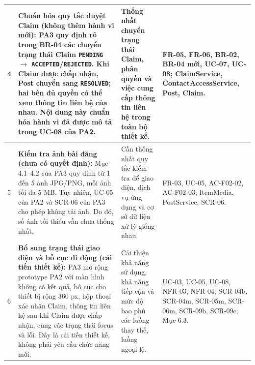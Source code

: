 \begin{longtable}{|p{}|p{}|p{}|p{}|}
4 &
\textbf{Chuẩn hóa quy tắc duyệt Claim (không thêm hành vi mới):}
PA3 quy định rõ trong BR-04 các chuyển trạng thái Claim
\texttt{PENDING} $\rightarrow$
\texttt{ACCEPTED}/\texttt{REJECTED}.
Khi Claim được chấp nhận, Post chuyển sang
\texttt{RESOLVED}; hai bên đủ quyền có thể xem
thông tin liên hệ của nhau. Nội dung này chuẩn hóa
hành vi đã được mô tả trong UC-08 của PA2.
&
Thống nhất chuyển trạng thái Claim, phân quyền
và việc cung cấp thông tin liên hệ trong toàn bộ
thiết kế.
&
FR-05, FR-06, BR-02, BR-04 mới,
UC-07, UC-08;
ClaimService, ContactAccessService,
Post, Claim.
\\ \hline

5 &
\textbf{Kiểm tra ảnh bài đăng (chưa có quyết định):}
Mục 4.1--4.2 của PA3 quy định từ 1 đến 5 ảnh JPG/PNG,
mỗi ảnh tối đa 5 MB. Tuy nhiên, UC-05 của PA2 và
SCR-06 của PA3 cho phép không tải ảnh.
Do đó, số ảnh tối thiểu vẫn chưa thống nhất.
&
Cần thống nhất quy tắc kiểm tra để giao diện,
dịch vụ ứng dụng và cơ sở dữ liệu xử lý giống nhau.
&
FR-03, UC-05, AC-F02-02, AC-F02-03;
ItemMedia, PostService, SCR-06.
\\ \hline

6 &
\textbf{Bổ sung trạng thái giao diện và bố cục di động (cải tiến thiết kế):}
PA3 mở rộng prototype PA2 với màn hình không có kết quả,
bố cục cho thiết bị rộng 360 px, hộp thoại xác nhận Claim,
thông tin liên hệ sau khi Claim được chấp nhận,
cùng các trạng thái focus và lỗi.
Đây là cải tiến thiết kế, không phải yêu cầu chức năng mới.
&
Cải thiện khả năng sử dụng, khả năng tiếp cận
và mức độ bao phủ các luồng thay thế, luồng ngoại lệ.
&
UC-03, UC-05, UC-08,
NFR-03, NFR-04;
SCR-04b, SCR-04m, SCR-05m,
SCR-06m, SCR-09b, SCR-09c;
Mục 6.3.
\\ \hline
\end{longtable}
